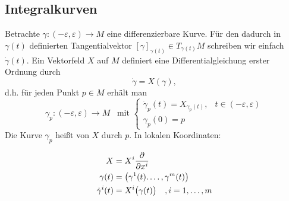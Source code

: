 \subsection{Integralkurven} %
\label{sub:22}
Betrachte $\gamma : ({-\varepsilon}, \varepsilon) \to M$ eine differenzierbare Kurve. Für den dadurch in $\gamma(t)$ definierten Tangentialvektor 
$[\gamma]_{\gamma(t)} \in T_{\gamma(t)}M$ schreiben wir einfach $\dot \gamma(t)$. Ein Vektorfeld $X$ auf $M$ definiert eine Differentialgleichung erster Ordnung durch
\[
	\dot \gamma = X(\gamma),
\]
d.h. für jeden Punkt $p \in M$ erhält man 
\[
	\gamma_p : ({-\varepsilon, \varepsilon}) \to M \enspace \text{ mit } \begin{cases}
		\dot \gamma_p (t) = X_{\gamma_p(t)}, &t \in (-\varepsilon, \varepsilon)\\
		\gamma_p(0) = p
	\end{cases}
\]
Die Kurve $\gamma_p$ heißt  von $X$ durch $p$. In lokalen Koordinaten: \smallskip\\
\begin{minipage}[c]{0.4\textwidth}
	\begin{align*}
		X &= X^i \diff{}{x^i} \\
		\gamma(t) &= \enbrace*{\gamma^1(t). \ldots , \gamma^m(t)} \\
		{\dot{\gamma}}^i (t) &= X^i \enbrace[\big]{\gamma(t)} \quad , i=1,\ldots ,m 
	\end{align*}
\end{minipage}
\begin{minipage}[c]{0.55\textwidth}
	\captionsetup{type=figure, skip=2pt}
\end{minipage}
\newpage
